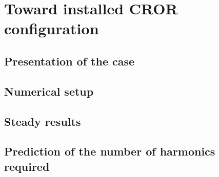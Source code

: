 \chapter{Toward installed CROR configuration}
\label{cha:hera3_installed}

\chabstract{}

\minitoc
\newpage

\section{Presentation of the case}
\label{sec:hera3_presentation}


\section{Numerical setup}
\label{sec:hera3_numerical}


\section{Steady results}
\label{sec:hera3_steady_results}


\section{Prediction of the number of harmonics required}
\label{sec:hera3_prediction_harm}


\chconclu{}

